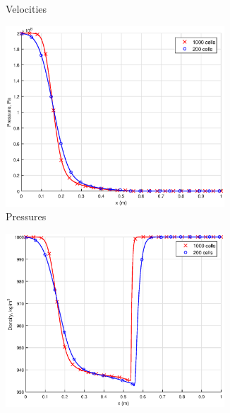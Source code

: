 \begin{figure}[H]
\begin{subfigure}[b]{0.45\textwidth}
                \caption{Velocities\\ \phantom{A}}
                \label{fig:nearly_pure_velocity_compare}
        \end{subfigure}
        \begin{subfigure}[b]{0.45\textwidth}
                \centering
                \includegraphics[width=0.9\textwidth]{figures/Nearly_pure_pressure_compare.eps}
                \caption{Pressures\\ \phantom{A}}
                \label{fig:nearly_pure_press_compare}
        \end{subfigure}        
        \begin{subfigure}[b]{0.45\textwidth}
                \centering
                \includegraphics[width=0.9\textwidth]{figures/Nearly_pure_density_liq_compare.eps}

\end{subfigure}
\end{figure}
